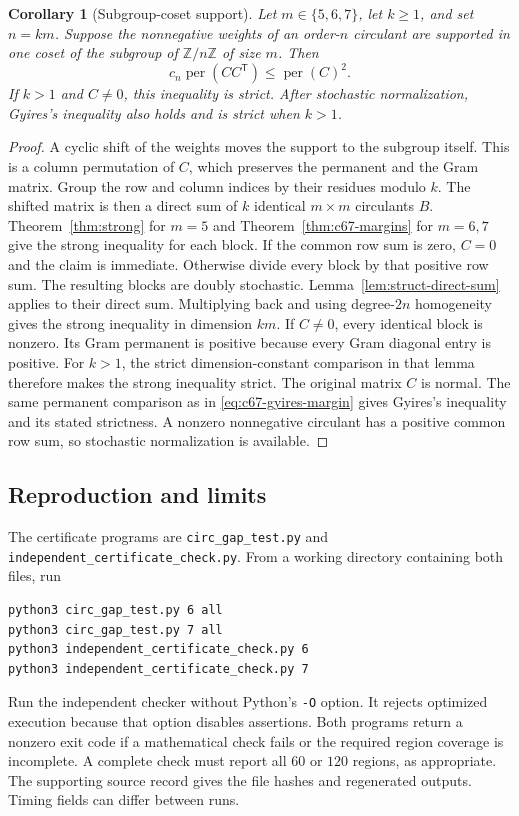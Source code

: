 \documentclass[11pt,a4paper]{article}
\newtheorem{corollary}[theorem]{Corollary}
\theoremstyle{definition}
\theoremstyle{remark}
\newcommand{\Z}{\mathbb{Z}}
\newcommand{\per}{\operatorname{per}}
\newcommand{\T}{\mathsf{T}}
\begin{document}
\begin{corollary}[Subgroup-coset support]\label{cor:c67-subgroup}
Let $m\in\{5,6,7\}$, let $k\ge1$, and set $n=km$.
Suppose the nonnegative weights of an order-$n$ circulant are supported
in one coset of the subgroup of $\Z/n\Z$ of size $m$.
Then
\[
 c_n\per(CC^\T)\le\per(C)^2.
\]
If $k>1$ and $C\ne0$, this inequality is strict.
After stochastic normalization, Gyires's inequality also holds and is
strict when $k>1$.
\end{corollary}

\begin{proof}
A cyclic shift of the weights moves the support to the subgroup itself.
This is a column permutation of $C$, which preserves the permanent and
the Gram matrix. Group the row and column indices by their residues
modulo $k$. The shifted matrix is then a direct sum of $k$ identical
$m\times m$ circulants $B$.
Theorem~\ref{thm:strong} for $m=5$ and
Theorem~\ref{thm:c67-margins} for $m=6,7$ give the strong inequality
for each block. If the common row sum is zero, $C=0$ and the claim is immediate. Otherwise divide every block by that positive row sum. The resulting blocks are doubly stochastic. Lemma~\ref{lem:struct-direct-sum} applies to their direct sum. Multiplying back and using degree-$2n$ homogeneity gives the strong inequality in dimension $km$.
If $C\ne0$, every identical block is nonzero. Its Gram permanent is
positive because every Gram diagonal entry is positive.
For $k>1$, the strict dimension-constant comparison in that lemma
therefore makes the strong inequality strict.
The original matrix $C$ is normal. The same permanent comparison as in
\eqref{eq:c67-gyires-margin} gives Gyires's inequality and its stated
strictness. A nonzero nonnegative circulant has a positive common row
sum, so stochastic normalization is available.
\end{proof}

\subsection{Reproduction and limits}

The certificate programs are \nolinkurl{circ_gap_test.py} and
\nolinkurl{independent_certificate_check.py}.
From a working directory containing both files, run
\begin{verbatim}
python3 circ_gap_test.py 6 all
python3 circ_gap_test.py 7 all
python3 independent_certificate_check.py 6
python3 independent_certificate_check.py 7
\end{verbatim}
Run the independent checker without Python's \texttt{-O} option.
It rejects optimized execution because that option disables assertions.
Both programs return a nonzero exit code if a mathematical check fails or the required region coverage is incomplete.
A complete check must report all $60$ or $120$ regions, as appropriate.
The supporting source record gives the file hashes and regenerated
outputs. Timing fields can differ between runs.
\end{document}
